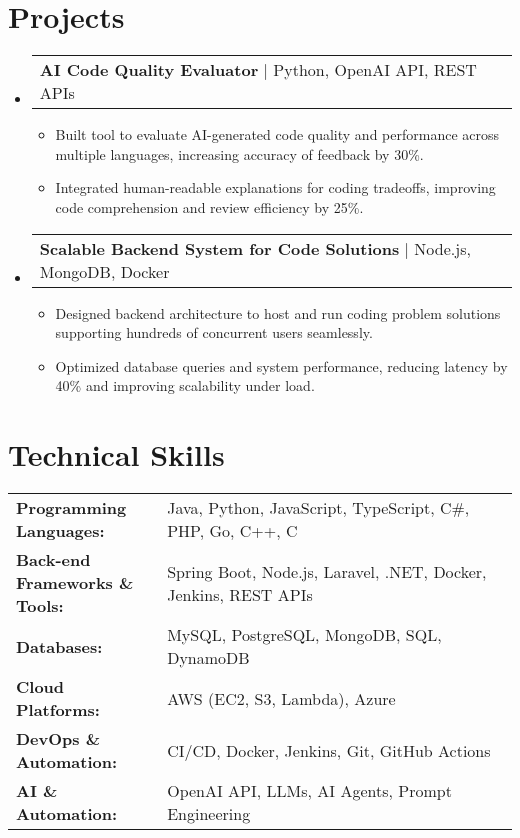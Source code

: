 \documentclass[letterpaper,11pt]{article}
\makeatletter
\newcommand{\resumeItem}[1]{
  \item\footnotesize{
    {#1 \vspace{-2pt}}
  }
}
\newcommand{\resumeProjectHeading}[2]{
    \item
    \begin{tabular*}{1.001\textwidth}{l@{\extracolsep{\fill}}r}
      \small#1 & \textbf{\small #2}\\
    \end{tabular*}\vspace{-7pt}
}
\newcommand{\resumeSubHeadingListStart}{\begin{itemize}[leftmargin=0pt, label={}]}
\newcommand{\resumeSubHeadingListEnd}{\end{itemize}}
\newcommand{\resumeItemListStart}{\begin{itemize}[leftmargin=*]}
\newcommand{\resumeItemListEnd}{\end{itemize}\vspace{-5pt}}
\makeatother
\begin{document}
\section{Projects}
    \vspace{-5pt}
    \resumeSubHeadingListStart
      \resumeProjectHeading
          {\textbf{AI Code Quality Evaluator} | Python, OpenAI API, REST APIs}{}
          \resumeItemListStart
              \resumeItem{Built tool to evaluate AI-generated code quality and performance across multiple languages, increasing accuracy of feedback by 30\%.}
              \resumeItem{Integrated human-readable explanations for coding tradeoffs, improving code comprehension and review efficiency by 25\%.}
          \resumeItemListEnd
          \vspace{-16pt}
      \resumeProjectHeading
          {\textbf{Scalable Backend System for Code Solutions} | Node.js, MongoDB, Docker}{}
          \resumeItemListStart
              \resumeItem{Designed backend architecture to host and run coding problem solutions supporting hundreds of concurrent users seamlessly.}
              \resumeItem{Optimized database queries and system performance, reducing latency by 40\% and improving scalability under load.}
          \resumeItemListEnd
    \resumeSubHeadingListEnd
\vspace{-10pt}
\section{Technical Skills}
        \vspace{-14pt}
        \begin{table}[h]
            \footnotesize
            \begin{tabular}{p{0.3\linewidth} p{0.7\linewidth}}
                \textbf{Programming Languages:} & Java, Python, JavaScript, TypeScript, C\#, PHP, Go, C++, C \\
                \textbf{Back-end Frameworks \& Tools:} & Spring Boot, Node.js, Laravel, .NET, Docker, Jenkins, REST APIs \\
                \textbf{Databases:} & MySQL, PostgreSQL, MongoDB, SQL, DynamoDB \\
                \textbf{Cloud Platforms:} & AWS (EC2, S3, Lambda), Azure \\
                \textbf{DevOps \& Automation:} & CI/CD, Docker, Jenkins, Git, GitHub Actions \\
                \textbf{AI \& Automation:} & OpenAI API, LLMs, AI Agents, Prompt Engineering \\
            \end{tabular}
        \end{table}
\end{document}
